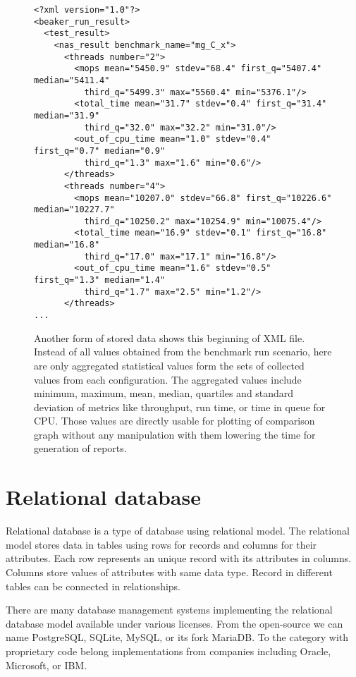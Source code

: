 \begin{figure}
  \small
  \begin{verbatim}
<?xml version="1.0"?>
<beaker_run_result>
  <test_result>
    <nas_result benchmark_name="mg_C_x">
      <threads number="2">
        <mops mean="5450.9" stdev="68.4" first_q="5407.4" median="5411.4"
          third_q="5499.3" max="5560.4" min="5376.1"/>
        <total_time mean="31.7" stdev="0.4" first_q="31.4" median="31.9"
          third_q="32.0" max="32.2" min="31.0"/>
        <out_of_cpu_time mean="1.0" stdev="0.4" first_q="0.7" median="0.9"
          third_q="1.3" max="1.6" min="0.6"/>
      </threads>
      <threads number="4">
        <mops mean="10207.0" stdev="66.8" first_q="10226.6" median="10227.7"
          third_q="10250.2" max="10254.9" min="10075.4"/>
        <total_time mean="16.9" stdev="0.1" first_q="16.8" median="16.8"
          third_q="17.0" max="17.1" min="16.8"/>
        <out_of_cpu_time mean="1.6" stdev="0.5" first_q="1.3" median="1.4"
          third_q="1.7" max="2.5" min="1.2"/>
      </threads>
...
\end{verbatim}
  \normalsize
  \caption{Another form of stored data shows this beginning of XML file. Instead
    of all values obtained from the benchmark run scenario, here are only
    aggregated statistical values form the sets of collected values from each
    configuration. The aggregated values include minimum, maximum, mean, median,
    quartiles and standard deviation of metrics like throughput, run time, or
    time in queue for CPU. Those values are directly usable for plotting of
    comparison graph without any manipulation with them lowering the time for
    generation of reports.}
  \label{fig:xml_sums}
\end{figure}

\section{Relational database}
Relational database is a type of database using relational model. The relational
model stores data in tables using rows for records and columns for their
attributes. Each row represents an unique record with its attributes in columns.
Columns store values of attributes with same data type. Record in different
tables can be connected in relationships.

There are many database management systems implementing the relational database
model available under various licenses. From the open-source we can name
PostgreSQL, SQLite, MySQL, or its fork MariaDB. To the category with proprietary
code belong implementations from companies including Oracle, Microsoft, or IBM.

